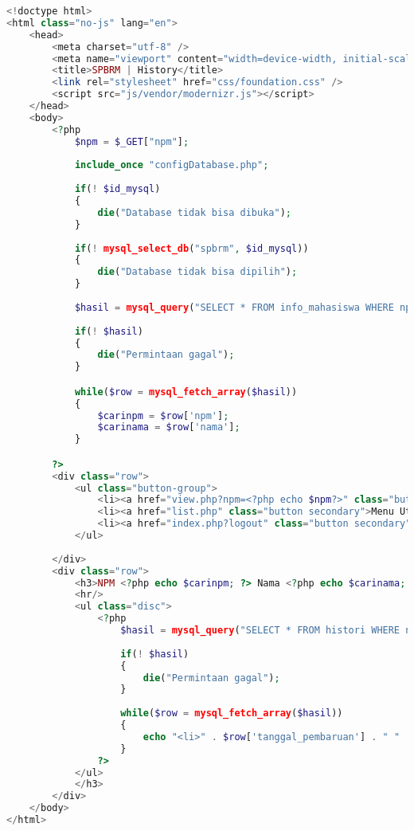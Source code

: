 \begin{lstlisting}[language=php,basicstyle=\tiny,caption=history.php]
<!doctype html>
<html class="no-js" lang="en">
	<head>
		<meta charset="utf-8" />
		<meta name="viewport" content="width=device-width, initial-scale=1.0" />
		<title>SPBRM | History</title>
		<link rel="stylesheet" href="css/foundation.css" />
		<script src="js/vendor/modernizr.js"></script>
	</head>
	<body>
		<?php
			$npm = $_GET["npm"];
			
			include_once "configDatabase.php";
				
			if(! $id_mysql)
			{
				die("Database tidak bisa dibuka");
			}
				
			if(! mysql_select_db("spbrm", $id_mysql))
			{
				die("Database tidak bisa dipilih");
			}
			
			$hasil = mysql_query("SELECT * FROM info_mahasiswa WHERE npm='$npm'", $id_mysql);
			
			if(! $hasil)
			{
				die("Permintaan gagal");
			}

			while($row = mysql_fetch_array($hasil))
			{
				$carinpm = $row['npm'];
				$carinama = $row['nama'];
			}

		?> 
		<div class="row">
			<ul class="button-group">
				<li><a href="view.php?npm=<?php echo $npm?>" class="button secondary">Kembali</a></li>
				<li><a href="list.php" class="button secondary">Menu Utama</a></li>
				<li><a href="index.php?logout" class="button secondary">Logout</a></li>
			</ul>
			
		</div>
		<div class="row">
			<h3>NPM <?php echo $carinpm; ?> Nama <?php echo $carinama; ?>
			<hr/>
			<ul class="disc">
				<?php
					$hasil = mysql_query("SELECT * FROM histori WHERE npm='$npm' ORDER BY id_histori DESC", $id_mysql);
			
					if(! $hasil)
					{
						die("Permintaan gagal");
					}
					
					while($row = mysql_fetch_array($hasil))
					{
						echo "<li>" . $row['tanggal_pembaruan'] . " " . $row['pengguna'] . " " . $row['status'] . " " . $row['npm'] . " " . ($row['keterangan'] != "" ? '<a href="past.php?id= '. $row['id_histori'] .'">[lihat versi ini]</a>' : "") . "</li>";
					}
				?>
			</ul>
			</h3>
		</div>
	</body>
</html>
\end{lstlisting}


